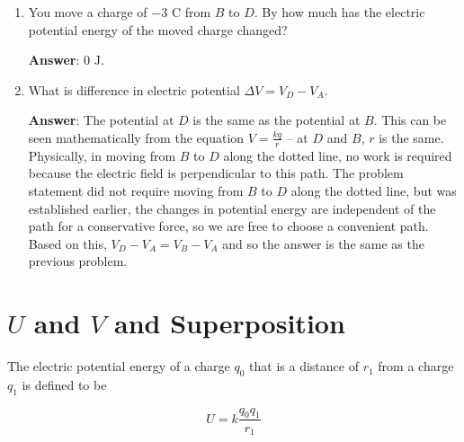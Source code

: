 \documentclass{article}
\begin{document}
\begin{enumerate}
  \item You move a charge of $-3\text{ C}$ from $B$ to $D$. By how much has the electric potential energy of the moved charge changed?

        \ifsolutions
          \textbf{Answer}: $0\text{ J}$.
        \else
          \vskip 48pt
        \fi

  \item What is difference in electric potential $\Delta V = V_D-V_A$.

        \ifsolutions
          \textbf{Answer}: The potential at $D$ is the same as the potential at $B$. This can be seen mathematically from the equation $V=\frac{kq}{r}$ -- at $D$ and $B$, $r$ is the same. Physically, in moving from $B$ to $D$ along the dotted line, no work is required because the electric field is perpendicular to this path. The problem statement did not require moving from $B$ to $D$ along the dotted line, but was established earlier, the changes in potential energy are independent of the path for a conservative force, so we are free to choose a convenient path. Based on this, $V_D-V_A=V_B-V_A$ and so the answer is the same as the previous problem.
        \else
          \vskip 48pt
        \fi

\end{enumerate}

\newpage

\section{$U$ and $V$ and Superposition}






The electric potential energy of a charge $q_0$ that is a distance of $r_1$ from a charge $q_1$ is defined to be 

\begin{equation}
U=k\frac{q_0q_1}{r_1}
\end{equation}
\end{document}
